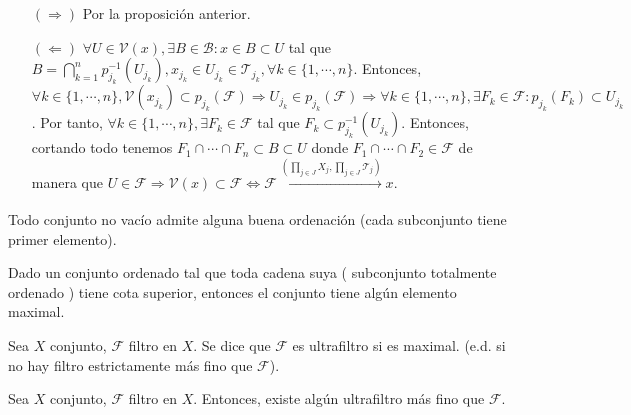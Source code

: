 \begin{dem}
  \begin{enumerate}[label=(\roman*)]
    \item []
    \item [$(\Rightarrow)$] Por la proposición anterior.
    \item [$(\Leftarrow)$] $\forall U \in \mathcal{V}(x), \exists B \in \mathcal{B} : x \in B \subset U$ tal que $B = \bigcap_{k = 1}^{n} p_{j_{k}}^{-1}(U_{j_{k}}), x_{j_{k}} \in U_{j_{k}} \in \mathcal{T}_{j_{k}}, \forall k \in \{ 1, \cdots, n \}$. Entonces, $\forall k \in \{ 1, \cdots, n \}, \mathcal{V}(x_{j_{k}}) \subset p_{j_{k}}(\mathcal{F}) \Rightarrow U_{j_{k}} \in p_{j_{k}}(\mathcal{F}) \Rightarrow \forall k \in \{ 1, \cdots, n \}, \exists F_{k} \in \mathcal{F} : p_{j_{k}}(F_{k}) \subset U_{j_{k}}$. Por tanto, $\forall k \in \{ 1, \cdots, n \}, \exists F_{k} \in \mathcal{F}$ tal que $F_{k} \subset p_{j_{k}}^{-1}(U_{j_{k}})$. Entonces, cortando todo tenemos $F_{1} \cap \cdots \cap F_{n} \subset B \subset U$ donde $F_{1} \cap \cdots \cap F_{2} \in \mathcal{F}$ de manera que $U \in \mathcal{F} \Rightarrow \mathcal{V}(x) \subset \mathcal{F} \Leftrightarrow \mathcal{F} \xrightarrow[]{ ( \prod_{j \in J} X_{j}, \prod_{j \in J} \mathcal{T}_{j} ) } x$.
  \end{enumerate}
\end{dem}

\begin{prop}
  Todo conjunto no vacío admite alguna buena ordenación (cada subconjunto tiene primer elemento).
\end{prop}

\begin{prop}
  Dado un conjunto ordenado tal que toda cadena suya ( subconjunto totalmente ordenado ) tiene cota superior, entonces el conjunto tiene algún elemento maximal.
\end{prop}

\begin{defn}[Ultrafiltro]
  Sea $X$ conjunto, $\mathcal{F }$ filtro en $X$. Se dice que $\mathcal{F}$ es ultrafiltro si es maximal. (e.d. si no hay filtro estrictamente más fino que $\mathcal{F}$).
\end{defn}

\begin{prop}
  Sea $X$ conjunto, $\mathcal{F}$ filtro en $X$. Entonces, existe algún ultrafiltro más fino que $\mathcal{F}$.
\end{prop}

